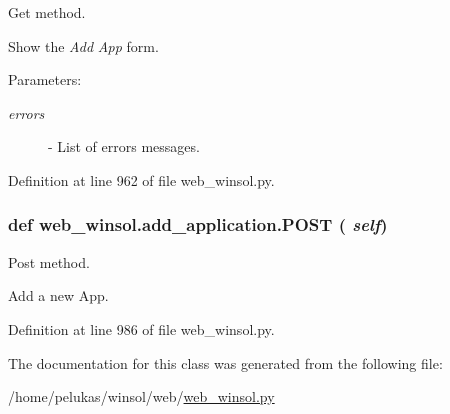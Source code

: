 Get method. 

Show the {\em Add\/} {\em App\/} form.

\begin{Desc}
\item[Parameters:]
\begin{description}
\item[{\em errors}]- List of errors messages. \end{description}
\end{Desc}


Definition at line 962 of file web\_\-winsol.py.\hypertarget{classweb__winsol_1_1add__application_ab1c3da35e2b0634d90c7b84742f3883}{
\subsubsection[POST]{\setlength{\rightskip}{0pt plus 5cm}def web\_\-winsol.add\_\-application.POST ( {\em self})}}
\label{classweb__winsol_1_1add__application_ab1c3da35e2b0634d90c7b84742f3883}


Post method. 

Add a new App. 

Definition at line 986 of file web\_\-winsol.py.

The documentation for this class was generated from the following file:\begin{CompactItemize}
\item 
/home/pelukas/winsol/web/\hyperlink{web__winsol_8py}{web\_\-winsol.py}\end{CompactItemize}

